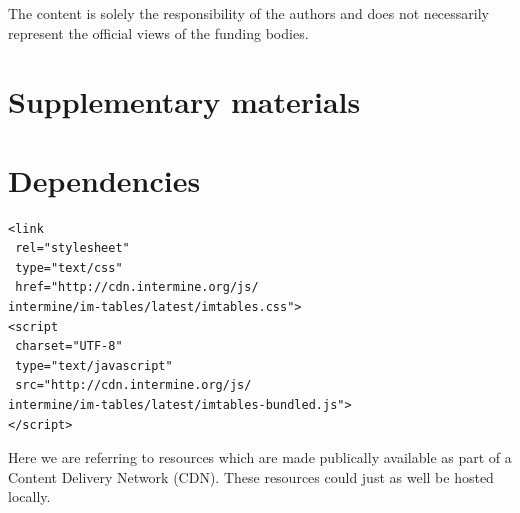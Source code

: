 \documentclass[10pt,a4paper,twocolumn]{article}
\begin{document}
The content is solely the responsibility of the authors and does not necessarily
represent the official views of the funding bodies.

\nocite{*}
{\small
}

\section*{Supplementary materials}
\appendix
\section{Dependencies} \label{sec:deps}

\lstset{language=HTML}

\begin{lstlisting}
<link
 rel="stylesheet"
 type="text/css"
 href="http://cdn.intermine.org/js/
intermine/im-tables/latest/imtables.css">
<script
 charset="UTF-8"
 type="text/javascript"
 src="http://cdn.intermine.org/js/
intermine/im-tables/latest/imtables-bundled.js">
</script>
\end{lstlisting}

Here we are referring to resources which are made publically available
as part of a Content Delivery Network (CDN). These resources could just
as well be hosted locally.
\end{document}

